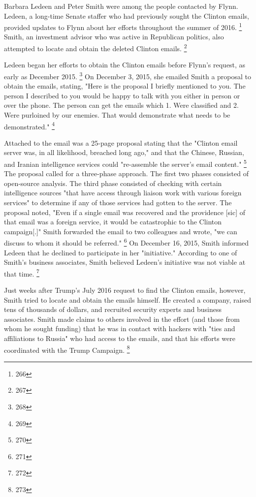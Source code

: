 Barbara Ledeen and Peter Smith were among the people contacted by Flynn.
Ledeen, a long-time Senate staffer who had previously sought the Clinton emails, provided updates to Flynn about her efforts throughout the summer of 2016.%
\footnote{266}
Smith, an investment advisor who was active in Republican politics, also attempted to locate and obtain the deleted Clinton emails.%
\footnote{267}

Ledeen began her efforts to obtain the Clinton emails before Flynn's request, as early as December 2015.%
\footnote{268}
On December 3, 2015, she emailed Smith a proposal to obtain the emails, stating, "Here is the proposal I briefly mentioned to you.
The person I described to you would be happy to talk with you either in person or over the phone.
The person can get the emails which 1. Were classified and 2. Were purloined by our enemies.
That would demonstrate what needs to be demonstrated."%
\footnote{269}

Attached to the email was a 25-page proposal stating that the "Clinton email server was, in all likelihood, breached long ago," and that the Chinese, Russian, and Iranian intelligence services could "re-assemble the server's email content."%
\footnote{270}
The proposal called for a three-phase approach.
The first two phases consisted of open-source analysis.
The third phase consisted of checking with certain intelligence sources "that have access through liaison work with various foreign services" to determine if any of those services had gotten to the server.
The proposal noted, "Even if a single email was recovered and the providence [sic] of that email was a foreign service, it would be catastrophic to the Clinton campaign[.]"
Smith forwarded the email to two colleagues and wrote, "we can discuss to whom it should be referred."%
\footnote{271}
On December 16, 2015, Smith informed Ledeen that he declined to participate in her "initiative."
According to one of Smith's business associates, Smith believed Ledeen's initiative was not viable at that time.%
\footnote{272}

Just weeks after Trump's July 2016 request to find the Clinton emails, however, Smith tried to locate and obtain the emails himself.
He created a company, raised tens of thousands of dollars, and recruited security experts and business associates.
Smith made claims to others involved in the effort (and those from whom he sought funding) that he was in contact with hackers with "ties and affiliations to Russia" who had access to the emails, and that his efforts were coordinated with the Trump Campaign.%
\footnote{273}

